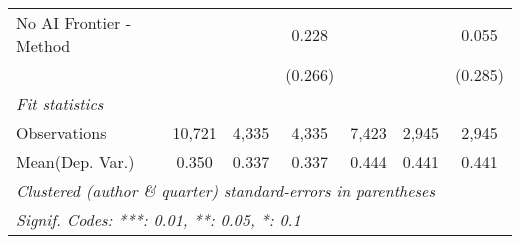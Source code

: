 \begin{tabular}{lcccccc}
   No AI Frontier - Method &               &         & 0.228        &               &              & 0.055\\   
                           &               &         & (0.266)      &               &              & (0.285)\\   
   \midrule
   \emph{Fit statistics}\\
   Observations            & 10,721        & 4,335   & 4,335        & 7,423         & 2,945        & 2,945\\  
Mean(Dep. Var.) & 0.350 & 0.337 & 0.337 & 0.444 & 0.441 & 0.441 \\
   \midrule \midrule
   \multicolumn{7}{l}{\emph{Clustered (author \& quarter) standard-errors in parentheses}}\\
   \multicolumn{7}{l}{\emph{Signif. Codes: ***: 0.01, **: 0.05, *: 0.1}}\\
\end{tabular}
\par\endgroup
